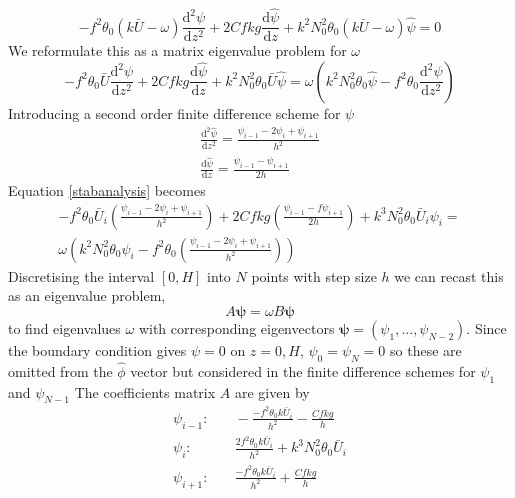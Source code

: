 \begin{equation*}
-f^2\theta_0(k\bar{U}-\omega)\frac{\text{d}^2{\psi}}{\text{d}z^2}+2Cfkg\frac{\text{d}\hat{\psi}}{\text{d}z}+k^2 N_0^2\theta_0(k\bar{U}-\omega)\hat{\psi}=0
\end{equation*}
We reformulate this as a matrix eigenvalue problem for $\omega$
\begin{equation}
-f^2\theta_0\bar{U}\frac{\text{d}^2{\psi}}{\text{d}z^2}+2Cfkg\frac{\text{d}\hat{\psi}}{\text{d}z}+k^2 N_0^2\theta_0\bar{U}\hat{\psi}=\omega \left(k^2N_0^2\theta_0\hat{\psi}-f^2\theta_0 \frac{\text{d}^2{\psi}}{\text{d}z^2}\right)
\label{stabanalysis}
\end{equation}
Introducing a second order finite difference scheme for $\psi$
\begin{equation*}
	\begin{aligned}
	\frac{\text{d}^2{\hat{\psi}}}{\text{d}z^2} = \frac{\psi_{i-1} - 2\psi_i + \psi_{i+1}}{h^2}\\
	\frac{\text{d}\hat{\psi}}{\text{d}z} = \frac{\psi_{i-1} - \psi_{i+1}}{2h}
	\end{aligned}
\end{equation*}
Equation \ref{stabanalysis} becomes
\begin{equation}
	\begin{aligned}
	-f^2\theta_0\bar{U}_i\left(\frac{\psi_{i-1} - 2\psi_i + \psi_{i+1}}{h^2}\right)+2Cfkg\left(\frac{\psi_{i-1} -f \psi_{i+1}}{2h}\right)+k^3 N_0^2\theta_0\bar{U}_i\psi_i= \\
	\omega\left(k^2N_0^2\theta_0\psi_i-f^2\theta_0\left(\frac{\psi_{i-1} - 2\psi_i + \psi_{i+1}}{h^2}\right)\right)
	\end{aligned}
\end{equation}
Discretising the interval $[0,H]$ into $N$ points with step size $h$ we can recast this as an eigenvalue problem,
\begin{equation*}
	A\bm{\psi} = \omega B\bm{\psi}
\end{equation*}
to find eigenvalues $\omega$ with corresponding eigenvectors $\bm{\psi} = \left(\psi_1, ... , \psi_{N-2}\right)$. Since the boundary condition gives $\psi = 0$ on $z = 0, H$, $\psi_0 = \psi_N = 0$ so these are omitted from the $\hat{\phi}$ vector but considered in the finite difference schemes for $\psi_1$ and $\psi_{N-1}$
The coefficients matrix $A$ are given by
\begin{equation}
	\begin{aligned}
		\psi_{i-1}:& \quad -\frac{-f^2\theta_0k\bar{U}_i}{h^2} - \frac{Cfkg}{h}\\
		\psi_i:& \quad \frac{2f^2\theta_0k\bar{U}_i}{h^2} + k^3N_0^2\theta_0\bar{U}_i\\
		\psi_{i+1}:& \quad \frac{-f^2\theta_0k\bar{U}_i}{h^2} + \frac{Cfkg}{h}\\
	\end{aligned}
\end{equation}
